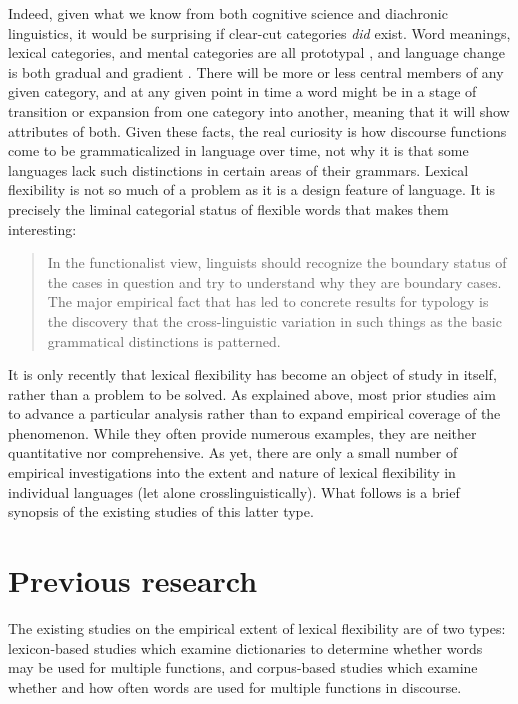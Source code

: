 Indeed, given what we know from both cognitive science and diachronic linguistics, it would be surprising if clear-cut categories \emph{did} exist. Word meanings, lexical categories, and mental categories are all prototypal  , and language change is both gradual and gradient . There will be more or less central members of any given category, and at any given point in time a word might be in a stage of transition or expansion from one category into another, meaning that it will show attributes of both. Given these facts, the real curiosity is how discourse functions come to be grammaticalized in language over time, not why it is that some languages lack such distinctions in certain areas of their grammars. Lexical flexibility is not so much of a problem as it is a design feature of language. It is precisely the liminal categorial status of flexible words that makes them interesting:

\blockquote[]{In the functionalist view, linguists should recognize the boundary status of the cases in question and try to understand why they are boundary cases. The major empirical fact that has led to concrete results for typology is the discovery that the cross-linguistic variation in such things as the basic grammatical distinctions is patterned.}

It is only recently that lexical flexibility has become an object of study in itself, rather than a problem to be solved. As explained above, most prior studies aim to advance a particular analysis rather than to expand empirical coverage of the phenomenon. While they often provide numerous examples, they are neither quantitative nor comprehensive. As yet, there are only a small number of empirical investigations into the extent and nature of lexical flexibility in individual languages (let alone crosslinguistically). What follows is a brief synopsis of the existing studies of this latter type.

\section{Previous research}
\label{sec:1.2}

The existing studies on the empirical extent of lexical flexibility are of two types: lexicon-based studies which examine dictionaries to determine whether words may be used for multiple functions, and corpus-based studies which examine whether and how often words are used for multiple functions in discourse.

